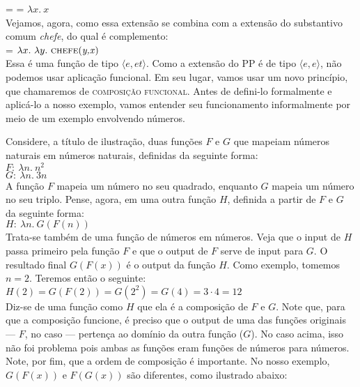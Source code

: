 \n {} =  = $\lambda x.\ x$ \\

\n Vejamos, agora, como essa extensão se combina com a extensão do substantivo comum \textit{chefe}, do qual é complemento:\\

\n {} = $\lambda x.\ \lambda y.\ \predica{chefe}{y,x}$ \\

\n Essa é uma função de tipo $\langle e,et\rangle$. Como a extensão do PP é de tipo $\langle e,e\rangle$, não podemos usar aplicação funcional. Em seu lugar, vamos usar um novo princípio, que chamaremos de \textsc{composição funcional}. Antes de defini-lo formalmente e aplicá-lo a nosso exemplo, vamos entender seu funcionamento informalmente por meio de um exemplo envolvendo números.

Considere, a título de ilustração, duas funções $F$ e $G$ que mapeiam números naturais em números naturais, definidas da seguinte forma:\\

\n $F:\ \lambda n.\ n^{2}$ \\
   $G:\ \lambda n.\ 3n$ \\
   
\n A função $F$ mapeia um número no seu quadrado, enquanto $G$ mapeia um número no seu triplo. Pense, agora, em uma outra função $H$, definida a partir de $F$ e $G$ da seguinte forma:\\

\n $H:\ \lambda n.\ G(F(n))$ \\

\n Trata-se também de uma função de números em números. Veja que o input de $H$ passa primeiro pela função $F$ e que o output de $F$ serve de input para $G$. O resultado final $G(F(x))$ é o output da função $H$. Como exemplo, tomemos $n=2$. Teremos então o seguinte:\\

\n $H(2) = G(F(2)) = G(2^{2}) = G(4) = 3 \cdot 4 = 12$ \\

\n Diz-se de uma função como $H$ que ela é a composição de $F$ e $G$. Note que, para que a composição funcione, é preciso que o output de uma das funções originais --- $F$, no caso --- pertença ao domínio da outra função ($G$). No caso acima, isso não foi problema pois ambas as funções eram funções de números para números. Note, por fim, que a ordem de composição é importante. No nosso exemplo, $G(F(x))$ e $F(G(x))$ são diferentes, como ilustrado abaixo:\\

